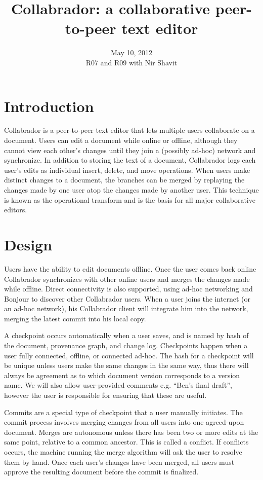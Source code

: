 \documentclass[11pt,titlepage]{article}
\title{Collabrador: a collaborative peer-to-peer text editor}
\author{
  \name{Jacob Hurwitz}{jhurwitz@mit.edu}
  \name{Colleen Josephson}{cjoseph@mit.edu}
  \name{David Lawrence}{dlaw@mit.edu}}
\date{
  May 10, 2012 \\ \small
  R07 and R09 with Nir Shavit}
\begin{document}
\maketitle

\section{Introduction}

Collabrador is a peer-to-peer text editor that lets multiple users
collaborate on a document. Users can edit a document while online or
offline, although they cannot view each other's changes until they
join a (possibly ad-hoc) network and synchronize.  In addition to
storing the text of a document, Collabrador logs each user's edits as
individual insert, delete, and move operations.  When users make
distinct changes to a document, the branches can be merged by
replaying the changes made by one user atop the changes made by
another user.  This technique is known as the operational
transform and is the basis for all major collaborative editors.

\section{Design}

Users have the ability to edit documents offline. Once the user comes back online Collabrador synchronizes with other online users and merges the changes made while offline. Direct connectivity is also supported, using ad-hoc networking and Bonjour to discover other Collabrador users. When a user joins the internet (or an ad-hoc network), his Collabrador client will integrate him into the network, merging the latest commit into his local copy.

A checkpoint occurs automatically when a user saves, and is named by hash of the document, provenance graph, and change log. Checkpoints happen when a user fully connected, offline, or connected ad-hoc. The hash for a checkpoint will be unique unless users make the same changes in the same way, thus there will always be agreement as to which document version corresponds to a version name. We will also allow user-provided comments e.g. ``Ben's final draft'', however the user is responsible for ensuring that these are useful. 

Commits are a special type of checkpoint that a user manually initiates. The commit process involves merging changes from all users into one agreed-upon document. Merges are autonomous unless there has been two or more edits at the same point, relative to a common ancestor. This is called a conflict. If conflicts occurs, the machine running the merge algorithm will ask the user to resolve them by hand. Once each user's changes have been merged, all users must approve the resulting document before the commit is finalized. 
\end{document}
